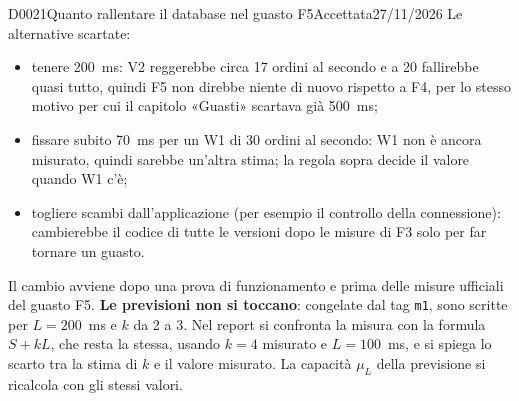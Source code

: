 \begin{decisione}{D0021}{Quanto rallentare il database nel guasto F5}{Accettata}{27/11/2026}
Le alternative scartate:
\begin{itemize}
  \item tenere 200~ms: V2 reggerebbe circa 17 ordini al secondo e a 20 fallirebbe quasi tutto, quindi F5 non direbbe niente di nuovo rispetto a F4, per lo stesso motivo per cui il capitolo «Guasti» scartava già 500~ms;
  \item fissare subito 70~ms per un W1 di 30 ordini al secondo: W1 non è ancora misurato, quindi sarebbe un'altra stima; la regola sopra decide il valore quando W1 c'è;
  \item togliere scambi dall'applicazione (per esempio il controllo della connessione): cambierebbe il codice di tutte le versioni dopo le misure di F3 solo per far tornare un guasto.
\end{itemize}

\conseguenze
Il cambio avviene dopo una prova di funzionamento e prima delle misure ufficiali del guasto F5. \textbf{Le previsioni non si toccano}: congelate dal tag \texttt{m1}, sono scritte per $L = 200$~ms e $k$ da 2 a 3. Nel report si confronta la misura con la formula $S + kL$, che resta la stessa, usando $k = 4$ misurato e $L = 100$~ms, e si spiega lo scarto tra la stima di $k$ e il valore misurato. La capacità $\mu_L$ della previsione si ricalcola con gli stessi valori.

\end{decisione}
